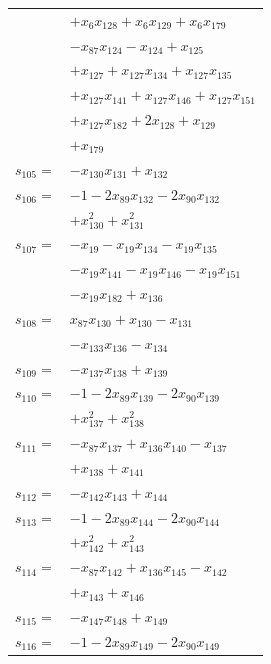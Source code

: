 \begin{longtable}{@{}r@{\;}l@{}}
 & \(\displaystyle +x_{6}x_{128} +x_{6}x_{129} +x_{6}x_{179}\) \\
 & \(\displaystyle -x_{87}x_{124} -x_{124} +x_{125}\) \\
 & \(\displaystyle +x_{127} +x_{127}x_{134} +x_{127}x_{135}\) \\
 & \(\displaystyle +x_{127}x_{141} +x_{127}x_{146} +x_{127}x_{151}\) \\
 & \(\displaystyle +x_{127}x_{182} +2x_{128} +x_{129}\) \\
 & \(\displaystyle +x_{179}\) \\[3pt]
\(s_{105}=\) & \(\displaystyle -x_{130}x_{131} +x_{132}\) \\[3pt]
\(s_{106}=\) & \(\displaystyle -1 -2x_{89}x_{132} -2x_{90}x_{132}\) \\
 & \(\displaystyle +x_{130}^{2} +x_{131}^{2}\) \\[3pt]
\(s_{107}=\) & \(\displaystyle -x_{19} -x_{19}x_{134} -x_{19}x_{135}\) \\
 & \(\displaystyle -x_{19}x_{141} -x_{19}x_{146} -x_{19}x_{151}\) \\
 & \(\displaystyle -x_{19}x_{182} +x_{136}\) \\[3pt]
\(s_{108}=\) & \(\displaystyle x_{87}x_{130} +x_{130} -x_{131}\) \\
 & \(\displaystyle -x_{133}x_{136} -x_{134}\) \\[3pt]
\(s_{109}=\) & \(\displaystyle -x_{137}x_{138} +x_{139}\) \\[3pt]
\(s_{110}=\) & \(\displaystyle -1 -2x_{89}x_{139} -2x_{90}x_{139}\) \\
 & \(\displaystyle +x_{137}^{2} +x_{138}^{2}\) \\[3pt]
\(s_{111}=\) & \(\displaystyle -x_{87}x_{137} +x_{136}x_{140} -x_{137}\) \\
 & \(\displaystyle +x_{138} +x_{141}\) \\[3pt]
\(s_{112}=\) & \(\displaystyle -x_{142}x_{143} +x_{144}\) \\[3pt]
\(s_{113}=\) & \(\displaystyle -1 -2x_{89}x_{144} -2x_{90}x_{144}\) \\
 & \(\displaystyle +x_{142}^{2} +x_{143}^{2}\) \\[3pt]
\(s_{114}=\) & \(\displaystyle -x_{87}x_{142} +x_{136}x_{145} -x_{142}\) \\
 & \(\displaystyle +x_{143} +x_{146}\) \\[3pt]
\(s_{115}=\) & \(\displaystyle -x_{147}x_{148} +x_{149}\) \\[3pt]
\(s_{116}=\) & \(\displaystyle -1 -2x_{89}x_{149} -2x_{90}x_{149}\) \\

\end{longtable}
